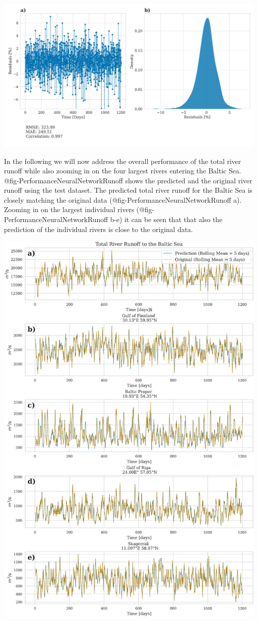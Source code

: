 \documentclass[
]{agujournal2019}
\begin{document}
\includegraphics{../src/figures/paper_error_metrics.png}

In the following we will now address the overall performance of the
total river runoff while also zooming in on the four largest rivers
entering the Baltic Sea. @fig-PerformanceNeuralNetworkRunoff shows the
predicted and the original river runoff using the test dataset. The
predicted total river runoff for the Baltic Sea is closely matching the
original data (@fig-PerformanceNeuralNetworkRunoff a). Zooming in on the
largest individual rivers (@fig-PerformanceNeuralNetworkRunoff b-e) it
can be seen that that also the prediction of the individual rivers is
close to the original data.

\includegraphics{../src/figures/paper_total_river_runoff.png}
\end{document}
